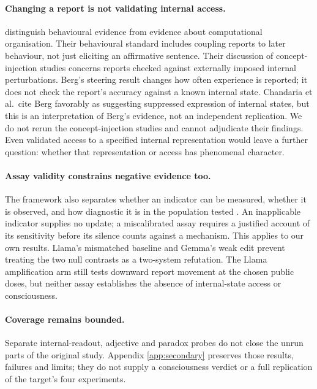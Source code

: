 \documentclass[11pt]{article}
\begin{document}
\paragraph{Changing a report is not validating internal access.}
\citet[Secs.~5.1--5.2 and 9.8]{chandaria2026cacophony} distinguish
behavioural evidence from evidence about computational organisation. Their
behavioural standard includes coupling reports to later behaviour, not just
eliciting an affirmative sentence. Their discussion of concept-injection
studies concerns reports checked against externally imposed internal
perturbations. Berg's steering result changes how often experience is
reported; it does not check the report's accuracy against a known internal
state. Chandaria et al.\ cite Berg favorably as suggesting suppressed
expression of internal states, but this is an interpretation of Berg's
evidence, not an independent replication. We do not rerun the concept-injection
studies and cannot adjudicate their findings. Even validated access to a
specified internal representation would leave a further question: whether
that representation or access has phenomenal character.

\paragraph{Assay validity constrains negative evidence too.}
The framework also separates whether an indicator can be measured, whether
it is observed, and how diagnostic it is in the population tested
\citep[Sec.~7.1]{chandaria2026cacophony}. An inapplicable indicator supplies
no update; a miscalibrated assay requires a justified account of its
sensitivity before its silence counts against a mechanism. This applies to
our own results. Llama's mismatched baseline and Gemma's weak edit prevent
treating the two null contrasts as a two-system refutation. The Llama
amplification arm still tests downward report movement at the chosen public
doses, but neither assay establishes the absence of internal-state access or
consciousness.

\paragraph{Coverage remains bounded.}
Separate internal-readout, adjective and paradox probes do not close the
unrun parts of the original study. Appendix \ref{app:secondary} preserves
those results, failures and limits; they do not supply a consciousness verdict
or a full replication of the target's four experiments.
\end{document}
